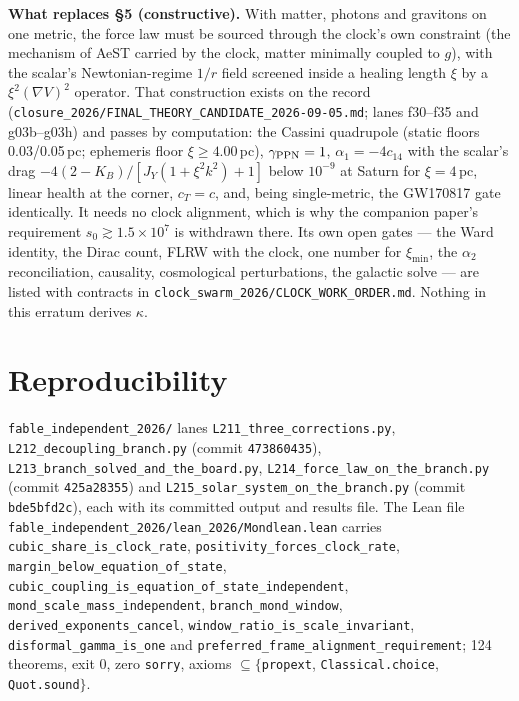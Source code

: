 \documentclass[11pt,letterpaper]{article}
\begin{document}
\textbf{What replaces \S5 (constructive).} With matter, photons and gravitons on one metric, the force law must be sourced through the clock's own constraint (the mechanism of AeST carried by the clock, matter minimally coupled to $g$), with the scalar's Newtonian-regime $1/r$ field screened inside a healing length $\xi$ by a $\xi^2(\nabla V)^2$ operator. That construction exists on the record (\texttt{closure\_2026/}\allowbreak\texttt{FINAL\_THEORY\_CANDIDATE\_2026-09-05.md}; lanes f30--f35 and g03b--g03h) and passes by computation: the Cassini quadrupole (static floors 0.03/0.05\,pc; ephemeris floor $\xi\ge4.00$\,pc), $\gamma_{\rm PPN}=1$, $\alpha_1=-4c_{14}$ with the scalar's drag $-4(2-K_B)/[J_Y(1+\xi^2k^2)+1]$ below $10^{-9}$ at Saturn for $\xi=4$\,pc, linear health at the corner, $c_T=c$, and, being single-metric, the GW170817 gate identically. It needs no clock alignment, which is why the companion paper's requirement $s_0\gtrsim1.5\times10^{7}$ is withdrawn there. Its own open gates --- the Ward identity, the Dirac count, FLRW with the clock, one number for $\xi_{\min}$, the $\alpha_2$ reconciliation, causality, cosmological perturbations, the galactic solve --- are listed with contracts in \texttt{clock\_swarm\_2026/}\allowbreak\texttt{CLOCK\_WORK\_ORDER.md}. Nothing in this erratum derives $\kappa$.

\section{Reproducibility}
\texttt{fable\_independent\_2026/} lanes \texttt{L211\_three\_corrections.py}, \texttt{L212\_decoupling\_branch.py} (commit \texttt{473860435}), \texttt{L213\_branch\_solved\_and\_the\_board.py}, \texttt{L214\_force\_law\_on\_the\_branch.py} (commit \texttt{425a28355}) and \texttt{L215\_solar\_system\_on\_the\_branch.py} (commit \texttt{bde5bfd2c}), each with its committed output and results file. The Lean file \texttt{fable\_independent\_2026/lean\_2026/Mondlean.lean} carries \texttt{cubic\_share\_is\_clock\_rate}, \texttt{positivity\_forces\_clock\_rate}, \texttt{margin\_below\_equation\_of\_state}, \texttt{cubic\_coupling\_is\_equation\_of\_state\_independent}, \texttt{mond\_scale\_mass\_independent}, \texttt{branch\_mond\_window}, \texttt{derived\_exponents\_cancel}, \texttt{window\_ratio\_is\_scale\_invariant}, \texttt{disformal\_gamma\_is\_one} and \texttt{preferred\_frame\_alignment\_requirement}; 124 theorems, exit 0, zero \texttt{sorry}, axioms $\subseteq\{$\texttt{propext}, \texttt{Classical.choice}, \texttt{Quot.sound}$\}$.
\end{document}
